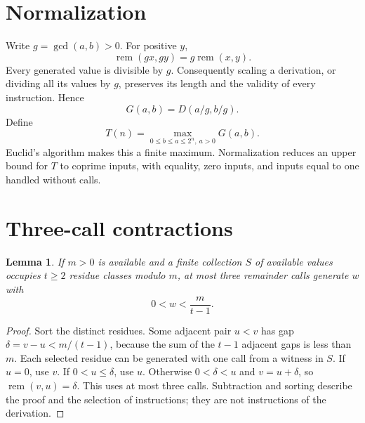 \documentclass[11pt]{article}
\newtheorem{lemma}[theorem]{Lemma}
\newcommand{\rem}{\operatorname{rem}}
\begin{document}
\section{Normalization}
Write $g=\gcd(a,b)>0$. For positive $y$,
\[
\rem(gx,gy)=g\rem(x,y).
\]
Every generated value is divisible by $g$. Consequently scaling a derivation,
or dividing all its values by $g$, preserves its length and the validity of
every instruction. Hence
\begin{equation}\label{eq:normalize}
G(a,b)=D(a/g,b/g).
\end{equation}
Define
\[
T(n)=\max_{0\leq b\leq a\leq 2^n,\ a>0}G(a,b).
\]
Euclid's algorithm makes this a finite maximum. Normalization reduces an upper
bound for $T$ to coprime inputs, with equality, zero inputs, and inputs equal to
one handled without calls.

\section{Three-call contractions}
\begin{lemma}\label{lem:gap}
If $m>0$ is available and a finite collection $S$ of available values occupies
$t\geq2$ residue classes modulo $m$, at most three remainder calls generate $w$
with
\[
0<w<\frac{m}{t-1}.
\]
\end{lemma}
\begin{proof}
Sort the distinct residues. Some adjacent pair $u<v$ has gap
$\delta=v-u<m/(t-1)$, because the sum of the $t-1$ adjacent gaps is less than
$m$. Each selected residue can be generated with one call from a witness in
$S$. If $u=0$, use $v$. If $0<u\leq\delta$, use $u$. Otherwise
$0<\delta<u$ and $v=u+\delta$, so $\rem(v,u)=\delta$. This uses at most three
calls. Subtraction and sorting describe the proof and the selection of
instructions; they are not instructions of the derivation.
\end{proof}
\end{document}
